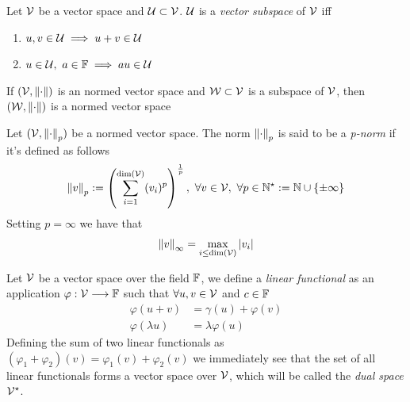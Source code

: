 \documentclass[../complete.tex]{subfiles}
\begin{document}
\begin{dfn}
	Let $\mathcal{V}$ be a vector space and $\operatorname{\mathcal{U}}\subset\mathcal{V}$. $\operatorname{\mathcal{U}}$ is a \textit{vector subspace} of $\mathcal{V}$ iff
	\begin{enumerate}
	\item $u,v\in\operatorname{\mathcal{U}}\implies{} u+v\in\operatorname{\mathcal{U}}$
	\item $u\in\operatorname{\mathcal{U}},\ a\in\mathbb{F}\implies{} au\in\operatorname{\mathcal{U}}$
	\end{enumerate}
\end{dfn}
\begin{prop}
	If $(\mathcal{V},\norm{\cdot})$ is an normed vector space and $\mathcal{W}\subset\mathcal{V}$ is a subspace of $\mathcal{V}$, then $(\mathcal{W},\norm{\cdot})$ is a normed vector space
\end{prop}
\begin{dfn}[p-norm]
	Let $(\mathcal{V},\norm{\cdot}_p)$ be a normed vector space. The norm $\norm{\cdot}_p$ is said to be a \textit{p-norm} if it's defined as follows
	\begin{equation}
		\norm{v}_p:=\left( \sum_{i=1}^{\dim(\mathcal{V})}(v_i)^p \right)^{\frac{1}{p}},\ \forall v\in\mathcal{V},\ \forall p\in\mathbb{N}^{\star}:=\mathbb{N}\cup\{\pm\infty\}
		\label{eq:pnorm}
	\end{equation}
	Setting $p=\infty$ we have that
	\begin{equation}
		\norm{v}_{\infty}=\max_{i\le\dim(\mathcal{V})}\abs{v_i}
		\label{eq:inftynorm}
	\end{equation}
\end{dfn}
\begin{dfn}
	Let $\mathcal{V}$ be a vector space over the field $\mathbb{F}$, we define a \textit{linear functional} as an application $\varphi:\mathcal{V}\overset{}{\longrightarrow}\mathbb{F}$ such that $\forall u,v\in\mathcal{V}$ and $c\in\mathbb{F}$
	\begin{equation}
		\begin{aligned}
			\varphi(u+v)&=\gamma(u)+\varphi(v)\\
			\varphi(\lambda u)&=\lambda\varphi(u)
		\end{aligned}
		\label{eq:linearfunctional}
	\end{equation}
	Defining the sum of two linear functionals as $(\varphi_1+\varphi_2)(v)=\varphi_1(v)+\varphi_2(v)$ we immediately see that the set of all linear functionals forms a vector space over $\mathcal{V}$, which will be called the \textit{dual space} $\mathcal{V}^\star$.
\end{dfn}
\end{document}
